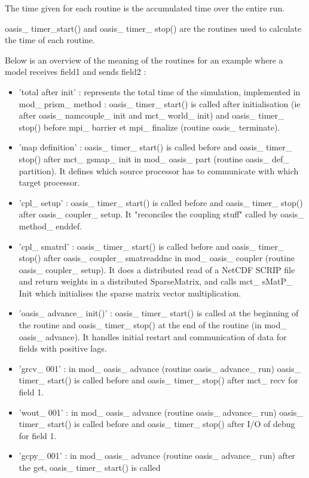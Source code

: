 The time given for each routine is the accumulated time over the entire run.

oasis\_ timer\_start() and oasis\_ timer\_ stop() are the routines used to calculate the time of each routine.

Below is an overview of the meaning of the routines for an example where a model receives field1 and sends field2 :

\begin{itemize}
\item {'total after init'} : represents the total time of the simulation, implemented in mod\_ prism\_ method : 
oasis\_ timer\_ start() is called after initialisation (ie after oasis\_ namcouple\_ init and mct\_ world\_ init) 
and oasis\_ timer\_ stop() before mpi\_ barrier et mpi\_ finalize (routine oasis\_ terminate).
\item {'map definition'} : oasis\_ timer\_ start() is called before and oasis\_ timer\_ stop() after mct\_ gsmap\_ init 
in mod\_ oasis\_ part (routine oasis\_ def\_ partition). It defines which source processor has to communicate with which target processor.
\item {'cpl\_ setup'} : oasis\_ timer\_ start() is called before and oasis\_ timer\_ stop() after oasis\_ coupler\_ setup. It 
"reconciles the coupling stuff" called by oasis\_ method\_ enddef.
\item {'cpl\_ smatrd'} : oasis\_ timer\_ start() is called before and oasis\_ timer\_ stop() after oasis\_ coupler\_ smatreaddnc 
in mod\_ oasis\_ coupler (routine oasis\_ coupler\_ setup). It does a distributed read of a NetCDF SCRIP file and return weights 
in a distributed SparseMatrix, and calls mct\_ sMatP\_ Init which initialises the sparse matrix vector multiplication.
\item {'oasis\_ advance\_ init()'} : oasis\_ timer\_ start() is called at the beginning of the routine and oasis\_ timer\_ stop() 
at the end of the routine (in mod\_ oasis\_ advance). It handles initial restart and communication of data for fields with positive lags.
\item {'grcv\_ 001'} : in mod\_ oasis\_ advance (routine oasis\_ advance\_ run) oasis\_ timer\_ start() is called before and 
oasis\_ timer\_ stop() after mct\_ recv for field 1.
\item {'wout\_ 001'} :  in mod\_ oasis\_ advance (routine oasis\_ advance\_ run) oasis\_ timer\_ start() is called before and 
oasis\_ timer\_ stop() after I/O of debug for field 1.
\item {'gcpy\_ 001'} :  in mod\_ oasis\_ advance (routine oasis\_ advance\_ run) after the get, oasis\_ timer\_ start() is called 

\end{itemize}
